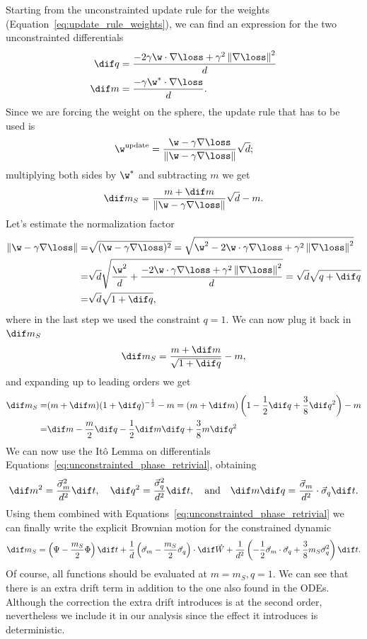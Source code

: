 Starting from the unconstrainted update rule for the weights (Equation~\eqref{eq:update_rule_weights}),
we can find an expression for the two unconstrainted differentials
\[\begin{split}
  \dif q &= \frac{-2\gamma \w\cdot\nabla{\loss} + \gamma^2\left\|\nabla{\loss}\right\|^2}{d} \\
  \dif m &= \frac{-\gamma \w^*\cdot\nabla\loss}{d}.
\end{split}\]
Since we are forcing the weight on the sphere, the update rule that has to be used is
\[
  \w^\text{update} =\frac{\w - \gamma \nabla{\loss}}{\left\|\w - \gamma \nabla{\loss}\right\|}\sqrt{d};
\]
multiplying both sides by \(\w^*\) and subtracting \(m\) we get
\[
  \dif m_S = \frac{m +\dif m}{\left\|\w - \gamma \nabla{\loss}\right\|}\sqrt{d} - m.
\]
Let's estimate the normalization factor
\[
  \begin{split}
  \left\|\w - \gamma \nabla{\loss}\right\| =& \sqrt{(\w - \gamma \nabla{\loss})^2}
                                           =  \sqrt{\w^2 - 2\w\cdot\gamma \nabla{\loss}+\gamma^2\left\|\nabla{\loss}\right\|^2} \\
                                           =& \sqrt{d}\sqrt{\frac{\w^2}{d} + \frac{- 2\w\cdot\gamma \nabla{\loss}+\gamma^2\left\|\nabla{\loss}\right\|^2}{d}}
                                           = \sqrt{d}\sqrt{q +\dif q} \\
                                           =& \sqrt{d}\sqrt{1 +\dif q},
  \end{split}
\]
where in the last step we used the constraint \(q=1\). We can now plug it back in \(\dif m_S\)
\[
  \dif m_S = \frac{m +\dif m}{\sqrt{1 +\dif q}} - m,
\]
and expanding up to leading orders we get
\[\begin{split}
  \dif m_S =& (m +\dif m)(1 +\dif q)^{-\frac12} - m = (m +\dif m)\left(1 -\frac12\dif q + \frac38\dif q^2\right)-m \\
           =& \dif m - \frac{m}{2}\dif q -\frac12 \dif m \dif q + \frac38 m \dif q^2
\end{split}\]
We can now use the Itô Lemma on differentials Equations~\eqref{eq:unconstrainted_phase_retrivial},
obtaining 
\[
  \dif m^2 =    \frac{\vec{\sigma}_m^2}{d^2}\dif t, \quad
  \dif q^2 =    \frac{\vec{\sigma}_q^2}{d^2}\dif t, \quad\text{and}\quad
  \dif m \dif q = \frac{\vec{\sigma}_m  }{d^2}\cdot \vec{\sigma}_q \dif t.
\]
Using them combined with Equations~\eqref{eq:unconstrainted_phase_retrivial} we can finally write
the explicit Brownian motion for the constrained dynamic
\begin{equation} \label{eq:constrained_brownian_motion}
  \dif m_S = \left(\Psi - \frac{m_S}{2}\Phi\right)\dif t
            + \frac{1}{d}\left(\vec{\sigma}_m-\frac{m_S}{2}\vec{\sigma}_q\right)\cdot \dif \vec{W}
            + \frac{1}{d^2}\left(-\frac12\vec{\sigma}_m \cdot \vec{\sigma}_q +\frac38 m_S \vec{\sigma}^2_q\right)\dif t.
\end{equation}
Of course, all functions should be evaluated at \(m=m_S, q=1\).
We can see that there is an extra drift term in addition to the one also found in the ODEs.
Although the correction the extra drift introduces is at the second order,
nevertheless we include it in our analysis since the effect it introduces is deterministic.

